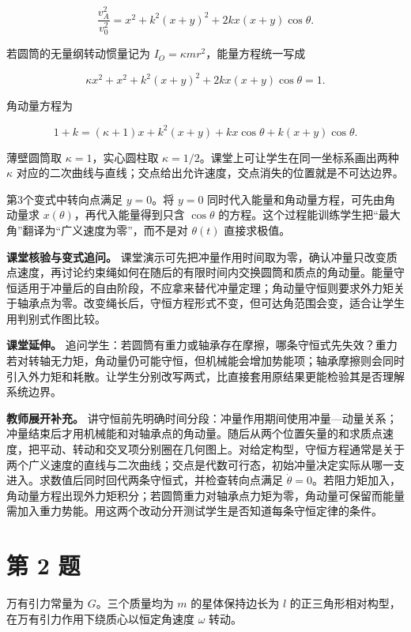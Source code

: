 \documentclass[12pt,a4paper,UTF8]{ctexart}
\begin{document}
\[
\frac{v_A^2}{v_0^2}
=x^2+k^2(x+y)^2+2kx(x+y)\cos\theta.
\]

若圆筒的无量纲转动惯量记为 \(I_O=\kappa mr^2\)，能量方程统一写成

\[
\kappa x^2+x^2+k^2(x+y)^2+2kx(x+y)\cos\theta=1.
\]

角动量方程为

\[
1+k=(\kappa+1)x+k^2(x+y)+kx\cos\theta+k(x+y)\cos\theta.
\]

薄壁圆筒取 \(\kappa=1\)，实心圆柱取
\(\kappa=1/2\)。课堂上可让学生在同一坐标系画出两种 \(\kappa\)
对应的二次曲线与直线；交点给出允许速度，交点消失的位置就是不可达边界。

第3个变式中转向点满足 \(y=0\)。将 \(y=0\)
同时代入能量和角动量方程，可先由角动量求
\(x(\theta)\)，再代入能量得到只含 \(\cos\theta\)
的方程。这个过程能训练学生把``最大角''翻译为``广义速度为零''，而不是对
\(\theta(t)\) 直接求极值。

\textbf{课堂核验与变式追问。}
课堂演示可先把冲量作用时间取为零，确认冲量只改变质点速度，再讨论约束绳如何在随后的有限时间内交换圆筒和质点的角动量。能量守恒适用于冲量后的自由阶段，不应拿来替代冲量定理；角动量守恒则要求外力矩关于轴承点为零。改变绳长后，守恒方程形式不变，但可达角范围会变，适合让学生用判别式作图比较。

\textbf{课堂延伸。}
追问学生：若圆筒有重力或轴承存在摩擦，哪条守恒式先失效？重力若对转轴无力矩，角动量仍可能守恒，但机械能会增加势能项；轴承摩擦则会同时引入外力矩和耗散。让学生分别改写两式，比直接套用原结果更能检验其是否理解系统边界。

\textbf{教师展开补充。}
讲守恒前先明确时间分段：冲量作用期间使用冲量---动量关系；冲量结束后才用机械能和对轴承点的角动量。随后从两个位置矢量的和求质点速度，把平动、转动和交叉项分别圈在几何图上。对给定构型，守恒方程通常是关于两个广义速度的直线与二次曲线；交点是代数可行态，初始冲量决定实际从哪一支进入。求数值后同时回代两条守恒式，并检查转向点满足
\(\dot\theta=0\)。若阻力矩加入，角动量方程出现外力矩积分；若圆筒重力对轴承点力矩为零，角动量可保留而能量需加入重力势能。用这两个改动分开测试学生是否知道每条守恒定律的条件。

\newpage

\section{第 2 题}\label{ux7b2c-2-ux9898}

万有引力常量为 \(G\)。三个质量均为 \(m\) 的星体保持边长为 \(l\)
的正三角形相对构型，在万有引力作用下绕质心以恒定角速度 \(\omega\) 转动。
\end{document}
